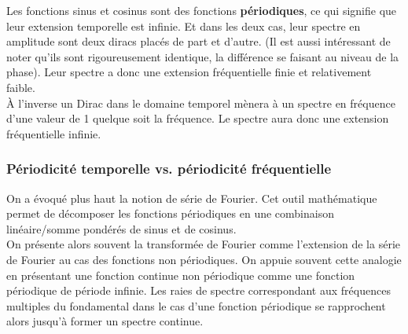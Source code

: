 \documentclass[11pt,a4paper]{article}
\begin{document}
Les fonctions sinus et cosinus sont des fonctions \textbf{périodiques}, ce qui signifie que leur extension temporelle est infinie. Et dans les deux cas, leur spectre en amplitude sont deux diracs placés de part et d'autre. (Il est aussi intéressant de noter qu'ils sont rigoureusement identique, la différence se faisant au niveau de la phase). Leur spectre a donc une extension fréquentielle finie et relativement faible.\\

\`A l'inverse un Dirac dans le domaine temporel mènera à un spectre en fréquence d'une valeur de 1 quelque soit la fréquence. Le spectre aura donc une extension fréquentielle infinie.\\

\subsubsection{Périodicité temporelle vs. périodicité fréquentielle}
On a évoqué plus haut la notion de série de Fourier. Cet outil mathématique permet de décomposer les fonctions périodiques en une combinaison linéaire/somme pondérés de sinus et de cosinus.\\

On présente alors souvent la transformée de Fourier comme l'extension de la série de Fourier au cas des fonctions non périodiques. On appuie souvent cette analogie en présentant une fonction continue non périodique comme une fonction périodique de période infinie. Les raies de spectre correspondant aux fréquences multiples du fondamental dans le cas d'une fonction périodique se rapprochent alors jusqu'à former un spectre continue.\\
\end{document}
